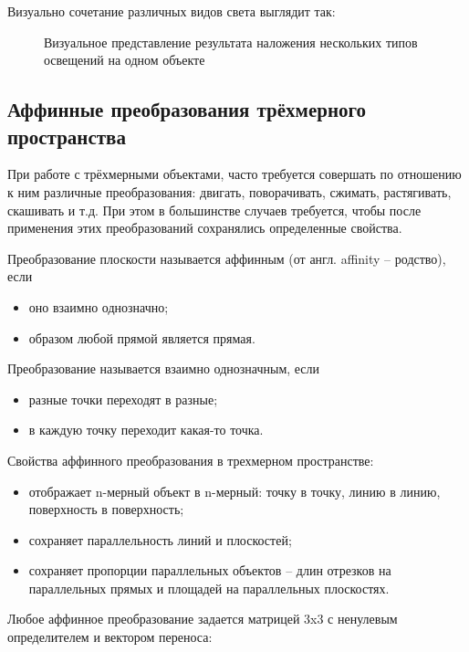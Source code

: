 Визуально сочетание различных видов света выглядит так:

\begin{figure}[H]
	\caption{Визуальное представление результата наложения нескольких типов освещений на одном объекте}
	\label{diagram11:image}
\end{figure}

\subsection{Аффинные преобразования трёхмерного пространства}

При работе с трёхмерными объектами, часто требуется совершать по отношению к ним различные преобразования: двигать, поворачивать, сжимать, растягивать, скашивать и т.д. При этом в большинстве случаев требуется, чтобы после применения этих преобразований сохранялись определенные свойства.

Преобразование плоскости называется аффинным (от англ. affinity – родство), если
\begin{itemize}
	\item оно взаимно однозначно;
	\item образом любой прямой является прямая.
\end{itemize}

Преобразование называется взаимно однозначным, если
\begin{itemize}
	\item разные точки переходят в разные;
	\item в каждую точку переходит какая-то точка.
\end{itemize}

Свойства аффинного преобразования в трехмерном пространстве:
\begin{itemize}
	\item отображает n-мерный объект в n-мерный: точку в точку, линию в линию, поверхность в поверхность;
	\item сохраняет параллельность линий и плоскостей;
	\item сохраняет пропорции параллельных объектов – длин отрезков на параллельных прямых и площадей на параллельных плоскостях.
\end{itemize}

Любое аффинное преобразование задается матрицей 3x3 с ненулевым определителем и вектором переноса:
\begin{figure}[H]
\end{figure}

